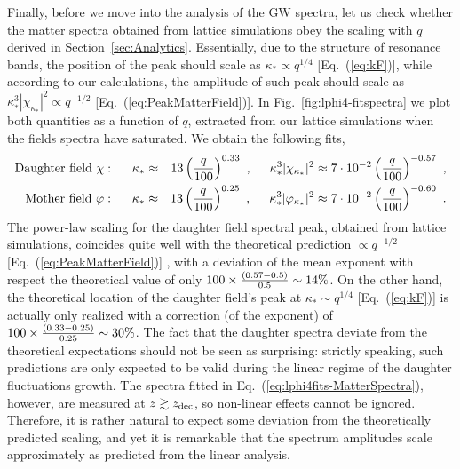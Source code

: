 \documentclass[a4paper,11pt]{article}
\newcommand{\bea}{\begin{eqnarray}}
\newcommand{\eea}{\end{eqnarray}}
\begin{document}
Finally, before we move into the analysis of the GW spectra, let us check whether the matter spectra obtained from lattice simulations obey the scaling with $q$ derived in Section~\ref{sec:Analytics}. Essentially, due to the structure of resonance bands, the position of the peak should scale as $\kappa_* \propto q^{1/4}$ [Eq.~(\ref{eq:kF})], while according to our calculations, the amplitude of such peak should scale as $\kappa_*^3 |\chi_{\kappa_*}|^2 \propto q^{-1/2}$ [Eq.~(\ref{eq:PeakMatterField})]. In Fig.~\ref{fig:lphi4-fitspectra} we plot both quantities as a function of $q$, extracted from our lattice simulations when the fields spectra have saturated. We obtain the following fits,
 \bea 
  {\rm Daughter~field}~\chi: \hspace{0.5cm} \kappa_* & \approx & 13 \left( \frac{q}{100} \right)^{0.33} \ , \hspace{0.5cm} \kappa_*^{3}{ |\chi_{\kappa_*} |^2}\approx  7 \cdot 10^{-2}   \left( \frac{q}{100} \right)^{-0.57} \ , \nonumber \\ 
 {\rm Mother~field}~\varphi: \hspace{0.5cm}\kappa_* &\approx & 13  \left( \frac{q}{100} \right)^{0.25} \ , \hspace{0.5cm} \kappa_*^{3} {| \varphi_{\kappa_*} |^2} \approx 7 \cdot 10^{-2}  \left( \frac{q}{100} \right)^{-0.60} \ .
 \label{eq:lphi4fits-MatterSpectra}
 \eea
The power-law scaling for the daughter field spectral peak, obtained from lattice simulations, coincides quite well with the theoretical prediction $\propto q^{-1/2}$ [Eq.~(\ref{eq:PeakMatterField})] , with a deviation of the mean exponent with respect the theoretical value of only $100\times{(0.57-0.5)\over0.5} \sim 14\%$. On the other hand, the theoretical location of the daughter field's peak at $\kappa_* \sim q^{1/4}$ [Eq.~(\ref{eq:kF})] is actually only realized with a correction (of the exponent) of $100\times{(0.33-0.25)\over0.25} \sim 30\%$. The fact that the daughter spectra deviate from the theoretical expectations should not be seen as surprising: strictly speaking, such predictions are only expected to be valid during the linear regime of the daughter fluctuations growth. The spectra fitted in Eq.~(\ref{eq:lphi4fits-MatterSpectra}), however, are measured at $z \gtrsim z_{\rm dec}$, so non-linear effects cannot be ignored. Therefore, it is rather natural to expect some deviation from the theoretically predicted scaling, and yet it is remarkable that the spectrum amplitudes scale approximately as predicted from the linear analysis.
\end{document}

